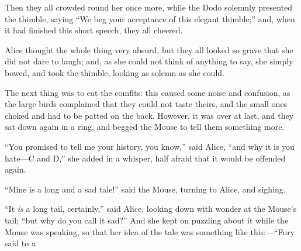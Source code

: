 \documentclass[book, 20pt]{extbook}
\begin{document}
Then they all crowded round her once more, while the Dodo solemnly
presented the thimble, saying ``We beg your acceptance of this elegant
thimble;'' and, when it had finished this short speech, they all
cheered.

Alice thought the whole thing very absurd, but they all looked so grave
that she did not dare to laugh; and, as she could not think of anything
to say, she simply bowed, and took the thimble, looking as solemn as she
could.

The next thing was to eat the comfits: this caused some noise and
confusion, as the large birds complained that they could not taste
theirs, and the small ones choked and had to be patted on the back.
However, it was over at last, and they sat down again in a ring, and
begged the Mouse to tell them something more.

``You promised to tell me your history, you know,'' said Alice, ``and
why it is you hate---C and D,'' she added in a whisper, half afraid that
it would be offended again.

``Mine is a long and a sad tale!'' said the Mouse, turning to Alice, and
sighing.

``It \emph{is} a long tail, certainly,'' said Alice, looking down with
wonder at the Mouse's tail; ``but why do you call it sad?'' And she kept
on puzzling about it while the Mouse was speaking, so that her idea of
the tale was something like this:---``Fury said to a
\end{document}
